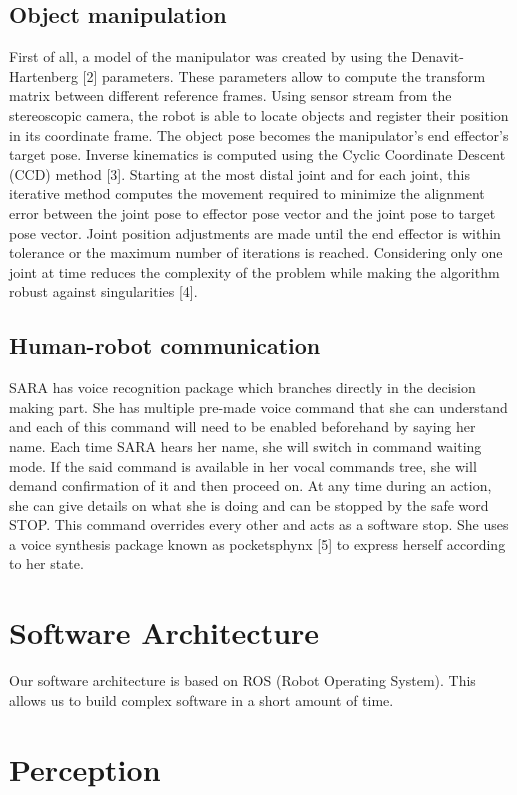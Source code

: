 \documentclass[runningheads,a4paper]{llncs}
\begin{document}
\subsection{Object manipulation}
\tab First of all, a model of the manipulator was created by using the Denavit-Hartenberg [2] parameters. These parameters allow to compute the transform matrix between different reference frames.
Using sensor stream from the stereoscopic camera, the robot is able to locate objects and register their position in its coordinate frame. The object pose becomes the manipulator's end effector's target pose.
Inverse kinematics is computed using the Cyclic Coordinate Descent (CCD) method [3]. Starting at the most distal joint and for each joint, this iterative method computes the movement required to minimize the alignment error between the joint pose to effector pose vector and the joint pose to target pose vector. Joint position adjustments are made until the end effector is within tolerance or the maximum number of iterations is reached.
Considering only one joint at time reduces the complexity of the problem while making the algorithm robust against singularities [4]. 

\subsection{Human-robot communication}
\tab SARA has voice recognition package which branches directly in the decision making part. She has multiple pre-made voice command that she can understand and each of this command will need to be enabled beforehand by saying her name. Each time SARA hears her name, she will switch in command waiting mode. If the said command is available in her vocal commands tree, she will demand confirmation of it and then proceed on. At any time during an action, she can give details on what she is doing and can be stopped by the safe word STOP. This command overrides every other and acts as a software stop. She uses a voice synthesis package known as
pocketsphynx [5] to express herself according to her state. 

\section{Software Architecture}
\tab Our software architecture is based on ROS (Robot Operating System). This allows us to build complex software in a short amount of time. 

\section{Perception}
\end{document}
